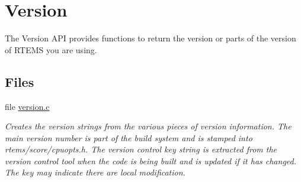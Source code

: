 \hypertarget{group__RTEMSAPIClassicVersion}{}\section{Version}
\label{group__RTEMSAPIClassicVersion}


The Version A\+PI provides functions to return the version or parts of the version of R\+T\+E\+MS you are using.  


\subsection*{Files}
\begin{DoxyCompactItemize}
\item 
file \mbox{\hyperlink{version_8c}{version.\+c}}
\begin{DoxyCompactList}\small\item\em Creates the version strings from the various pieces of version information. The main version number is part of the build system and is stamped into rtems/score/cpuopts.\+h. The version control key string is extracted from the version control tool when the code is being built and is updated if it has changed. The key may indicate there are local modification. \end{DoxyCompactList}\end{DoxyCompactItemize}

